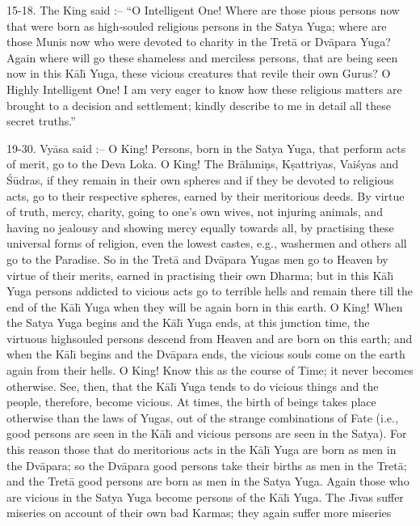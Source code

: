 15-18. The King said :-- ``O Intelligent One! Where are those pious persons now that were born as high-souled religious persons in the Satya Yuga; where are those Munis now who were devoted to charity in the Tret\=a or Dv\=apara Yuga? Again where will go these shameless and merciless persons, that are being seen now in this K\=al\={\i} Yuga, these vicious creatures that revile their own Gurus? O Highly Intelligent One! I am very eager to know how these religious matters are brought to a decision and settlement; kindly describe to me in detail all these secret truths.''

19-30. Vy\=asa said :-- O King! Persons, born in the Satya Yuga, that perform acts of merit, go to the Deva Loka. O King! The Br\=ahmi\d{n}s, K\d{s}attriyas, Vai\'syas and \'S\=udras, if they remain in their own spheres and if they be devoted to religious acts, go to their respective spheres, earned by their meritorious deeds. By virtue of truth, mercy, charity, going to one's own wives, not injuring animals, and having no jealousy and showing mercy equally towards all, by practising these universal forms of religion, even the lowest castes, e.g., washermen and others all go to the Paradise. So in the Tret\=a and Dv\=apara Yugas men go to Heaven by virtue of their merits, earned in practising their own Dharma; but in this K\=al\={\i} Yuga persons addicted to vicious acts go to terrible hells and remain there till the end of the K\=al\={\i} Yuga when they will be again born in this earth. O King! When the Satya Yuga begins and the K\=al\={\i} Yuga ends, at this junction time, the virtuous highsouled persons descend from Heaven and are born on this earth; and when the K\=al\={\i} begins and the Dv\=apara ends, the vicious souls come on the earth again from their hells. O King! Know this as the course of Time; it never becomes otherwise. See, then, that the K\=al\={\i} Yuga tends to do vicious things and the people, therefore, become vicious. At times, the birth of beings takes place otherwise than the laws of Yugas, out of the strange combinations of Fate (i.e., good persons are seen in the K\=al\={\i} and vicious persons are seen in the Satya). For this reason those that do meritorious acts in the K\=al\={\i} Yuga are born as men in the Dv\=apara; so the Dv\=apara good persons take their births as men in the Tret\=a; and the Tret\=a good persons are born as men in the Satya Yuga. Again those who are vicious in the Satya Yuga become persons of the K\=al\={\i} Yuga. The J\={\i}vas suffer miseries on account of their own bad Karmas; they again suffer more miseries

